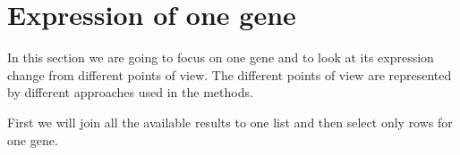 \documentclass[a4paper]{report}
\begin{document}

\section*{Expression of one gene}
In this section we are going to focus on one gene and to look at its expression change from different points of view. The different points of view are represented by different approaches used in the methods.\par
First we will join all the available results to one list and then select only rows for one gene.\par
\end{document}
